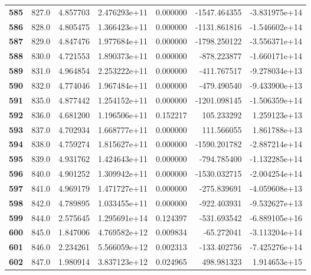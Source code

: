 \documentclass{report}[12pt]
\begin{document}
\begin{center}
\begin{tabular}{lrrrrrr}
\textbf{585 } &          827.0 &   4.857703 &  2.476293e+11 &    0.000000 & -1547.464355 & -3.831975e+14 \\
\textbf{586 } &          828.0 &   4.805475 &  1.366423e+11 &    0.000000 & -1131.861816 & -1.546602e+14 \\
\textbf{587 } &          829.0 &   4.847476 &  1.977684e+11 &    0.000000 & -1798.250122 & -3.556371e+14 \\
\textbf{588 } &          830.0 &   4.721553 &  1.890373e+11 &    0.000000 &  -878.223877 & -1.660171e+14 \\
\textbf{589 } &          831.0 &   4.964854 &  2.253222e+11 &    0.000000 &  -411.767517 & -9.278034e+13 \\
\textbf{590 } &          832.0 &   4.774046 &  1.967484e+11 &    0.000000 &  -479.490540 & -9.433900e+13 \\
\textbf{591 } &          835.0 &   4.877442 &  1.254152e+11 &    0.000000 & -1201.098145 & -1.506359e+14 \\
\textbf{592 } &          836.0 &   4.681200 &  1.196506e+11 &    0.152217 &   105.233292 &  1.259123e+13 \\
\textbf{593 } &          837.0 &   4.702934 &  1.668777e+11 &    0.000000 &   111.566055 &  1.861788e+13 \\
\textbf{594 } &          838.0 &   4.759274 &  1.815627e+11 &    0.000000 & -1590.201782 & -2.887214e+14 \\
\textbf{595 } &          839.0 &   4.931762 &  1.424643e+11 &    0.000000 &  -794.785400 & -1.132285e+14 \\
\textbf{596 } &          840.0 &   4.901252 &  1.309942e+11 &    0.000000 & -1530.032715 & -2.004254e+14 \\
\textbf{597 } &          841.0 &   4.969179 &  1.471727e+11 &    0.000000 &  -275.839691 & -4.059608e+13 \\
\textbf{598 } &          842.0 &   4.789895 &  1.033455e+11 &    0.000000 &  -922.403931 & -9.532627e+13 \\
\textbf{599 } &          844.0 &   2.575645 &  1.295691e+14 &    0.124397 &  -531.693542 & -6.889105e+16 \\
\textbf{600 } &          845.0 &   1.847006 &  4.769582e+12 &    0.009834 &   -65.272041 & -3.113204e+14 \\
\textbf{601 } &          846.0 &   2.234261 &  5.566059e+12 &    0.002313 &  -133.402756 & -7.425276e+14 \\
\textbf{602 } &          847.0 &   1.980914 &  3.837123e+12 &    0.024965 &   498.981323 &  1.914653e+15 \\

\end{tabular}
\end{center}
\end{document}
